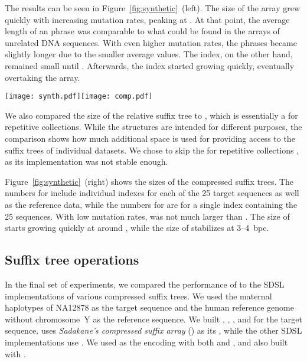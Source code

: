 The results can be seen in Figure~\ref{fig:synthetic}~(left). The size of the \RLCP{}
array grew quickly with increasing mutation rates, peaking at .
At that point, the average length of an \RLZ{} phrase was comparable to what
could be found in the \DLCP{} arrays of unrelated DNA sequences. With even
higher mutation rates, the phrases became slightly longer due to the smaller
average \LCP{} values. The \RFM{} index, on the other hand, remained small
until . Afterwards, the index started growing quickly, eventually
overtaking the \RLCP{} array.

\begin{figure*}
\begin{center}
\texttt{[image: synth.pdf]}\hspace{-0.6in}\texttt{[image: comp.pdf]}
\end{center}
\caption{Index size in bits per character vs.\ mutation rate for 25
synthetic sequences relative to a 20~MB reference.}\label{fig:synthetic}
\end{figure*}

We also compared the size of the relative suffix tree to \GCT{} \cite{Navarro2015},
which is essentially a \CSTsada{} for repetitive collections.
While the structures are intended for different purposes, the comparison shows how
much additional space is used for providing access to the suffix trees
of individual datasets. We chose to skip the \CSTnpr{} for repetitive collections
\cite{Abeliuk2013}, as its implementation was not stable enough.

Figure~\ref{fig:synthetic}~(right) shows the sizes of the compressed suffix
trees. The numbers for \RCST{} include individual indexes for each of the 25
target sequences as well as the reference data, while the numbers for \GCT{}
are for a single index containing the 25 sequences. With low mutation rates,
\RCST{} was not much larger than \GCT{}. The size of \RCST{} starts growing
quickly at around , while the size of \GCT{} stabilizes at
3\nobreakdash--4~bpc.

\subsection{Suffix tree operations}

In the final set of experiments, we compared the performance of \RCST{} to the
SDSL implementations of various compressed suffix trees. We used the maternal
haplotypes of NA12878 as the target sequence and the human reference genome
without chromosome~Y as the reference sequence. We built \RCST, \CSTsada,
\CSTnpr, and \FCST{} for the target sequence. \CSTsada{} uses \emph{Sadakane's
compressed suffix array} (\CSAsada) \cite{Sadakane2003} as its \CSA, while the
other SDSL implementations use \SSA. We used \PLCP{} as the \LCP{} encoding
with both \CSTsada{} and \CSTnpr{}, and also built \CSTnpr{} with \LCPdac.

